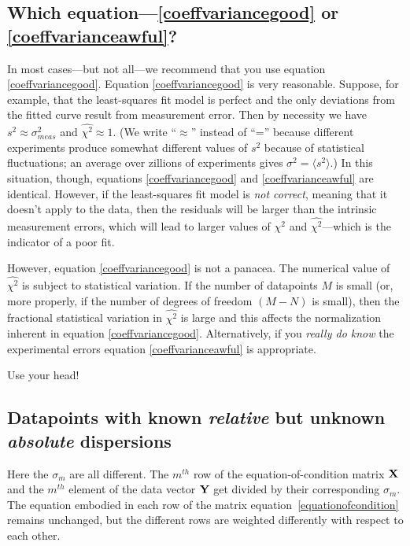 \documentclass[psfig,preprint]{aastex}
\begin{document}
\subsection{Which equation---\ref{coeffvariancegood} or
\ref{coeffvarianceawful}?}

	In most cases---but not all---we recommend that you use equation
\ref{coeffvariancegood}.  Equation \ref{coeffvariancegood} is very
reasonable.  Suppose, for example, that the least-squares fit model is
perfect and the only deviations from the fitted curve result from
measurement error.  Then by necessity we have $s^2 \approx
\sigma_{meas}^2$ and $\widehat{\chi^2} \approx 1$.  (We write
``$\approx$'' instead of ``='' because different experiments produce
somewhat different values of $s^2$ because of statistical fluctuations;
an average over zillions of experiments gives $\sigma^2 = \langle s^2
\rangle$.) In this situation, though, equations \ref{coeffvariancegood}
and \ref{coeffvarianceawful} are identical.  However, if the
least-squares fit model is {\it not correct}, meaning that it doesn't
apply to the data, then the residuals will be larger than the intrinsic
measurement errors, which will lead to larger values of $\chi^2$ and
$\widehat{\chi^2}$---which is the indicator of a poor fit. 

	However, equation \ref{coeffvariancegood} is not a panacea.  The
numerical value of $\widehat{\chi^2}$ is subject to statistical
variation.  If the number of datapoints $M$ is small (or, more properly,
if the number of degrees of freedom $(M-N)$ is small), then the
fractional statistical variation in $\widehat{\chi^2}$ is large and this
affects the normalization inherent in equation \ref{coeffvariancegood}.
Alternatively, if you {\it really do know} the experimental errors
equation \ref{coeffvarianceawful} is appropriate. 

	Use your head!

\subsection{Datapoints with known {\it relative} but unknown {\it
absolute} dispersions} \label{weightedcase}

	Here the $\sigma_{m}$ are all different. The $m^{th}$ row
of the equation-of-condition matrix ${\bf X}$ and the $m^{th}$
element of the data vector ${\bf Y}$ get divided by their
corresponding $\sigma_{m}$.  The equation embodied in each row of
the matrix equation~\ref{equationofcondition} remains unchanged, but the
different rows are weighted differently with respect to each other. 
\end{document}
